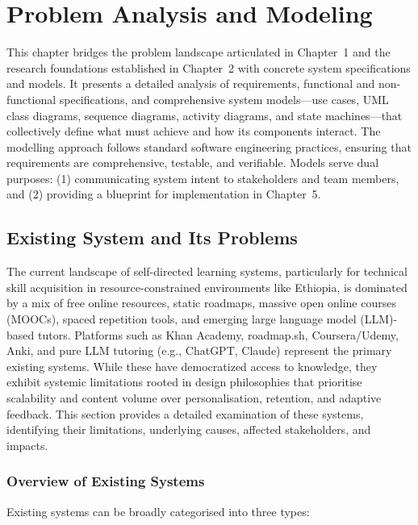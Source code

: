 \chapter{Problem Analysis and Modeling}

This chapter bridges the problem landscape articulated in Chapter~1 and the research foundations established in Chapter~2 with concrete system specifications and models. It presents a detailed analysis of requirements, functional and non-functional specifications, and comprehensive system models---use cases, UML class diagrams, sequence diagrams, activity diagrams, and state machines---that collectively define what \projectname{} must achieve and how its components interact. The modelling approach follows standard software engineering practices, ensuring that requirements are comprehensive, testable, and verifiable. Models serve dual purposes: (1) communicating system intent to stakeholders and team members, and (2) providing a blueprint for implementation in Chapter~5.

\section{Existing System and Its Problems}

The current landscape of self-directed learning systems, particularly for technical skill acquisition in resource-constrained environments like Ethiopia, is dominated by a mix of free online resources, static roadmaps, massive open online courses (MOOCs), spaced repetition tools, and emerging large language model (LLM)-based tutors. Platforms such as Khan Academy, roadmap.sh, Coursera/Udemy, Anki, and pure LLM tutoring (e.g., ChatGPT, Claude) represent the primary existing systems. While these have democratized access to knowledge, they exhibit systemic limitations rooted in design philosophies that prioritise scalability and content volume over personalisation, retention, and adaptive feedback. This section provides a detailed examination of these systems, identifying their limitations, underlying causes, affected stakeholders, and impacts.

\subsection*{Overview of Existing Systems}

Existing systems can be broadly categorised into three types:

